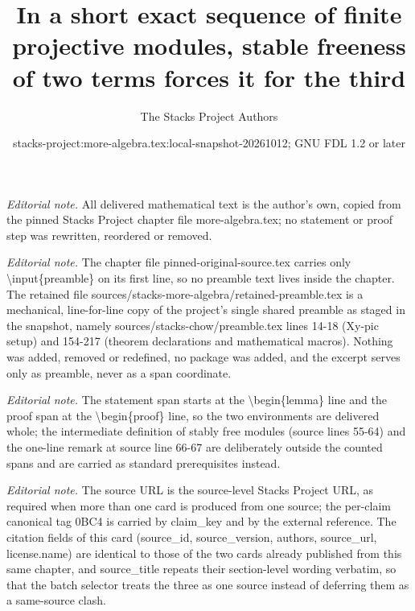 \documentclass[10pt,a4paper]{amsart}
\title{In a short exact sequence of finite projective modules, stable freeness of two terms forces it for the third}
\author{The Stacks Project Authors}
\date{stacks-project:more-algebra.tex:local-snapshot-20261012; GNU FDL 1.2 or later}
\theoremstyle{plain}
\theoremstyle{definition}
\theoremstyle{remark}
\numberwithin{equation}{subsection}
\begin{document}
\maketitle
\setcounter{subsection}{1}
\noindent\textit{Editorial note.} All delivered mathematical text is the author's own, copied from the pinned Stacks Project chapter file more-algebra.tex; no statement or proof step was rewritten, reordered or removed.\par\medskip
\noindent\textit{Editorial note.} The chapter file pinned-original-source.tex carries only \textbackslash{}input\{preamble\} on its first line, so no preamble text lives inside the chapter. The retained file sources/stacks-more-algebra/retained-preamble.tex is a mechanical, line-for-line copy of the project's single shared preamble as staged in the snapshot, namely sources/stacks-chow/preamble.tex lines 14-18 (Xy-pic setup) and 154-217 (theorem declarations and mathematical macros). Nothing was added, removed or redefined, no package was added, and the excerpt serves only as preamble, never as a span coordinate.\par\medskip
\noindent\textit{Editorial note.} The statement span starts at the \textbackslash{}begin\{lemma\} line and the proof span at the \textbackslash{}begin\{proof\} line, so the two environments are delivered whole; the intermediate definition of stably free modules (source lines 55-64) and the one-line remark at source line 66-67 are deliberately outside the counted spans and are carried as standard prerequisites instead.\par\medskip
\noindent\textit{Editorial note.} The source URL is the source-level Stacks Project URL, as required when more than one card is produced from one source; the per-claim canonical tag 0BC4 is carried by claim\_key and by the external reference. The citation fields of this card (source\_id, source\_version, authors, source\_url, license.name) are identical to those of the two cards already published from this same chapter, and source\_title repeats their section-level wording verbatim, so that the batch selector treats the three as one source instead of deferring them as a same-source clash.\par\medskip
\end{document}
